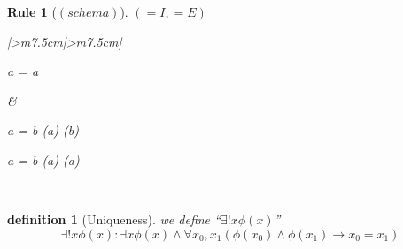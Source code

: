 \documentclass[10pt,a4paper]{book}
\newtheorem{definition}{definition}[section]
\newtheorem{Rule}{Rule}[section]
\begin{document}
\begin{Rule}
    [$(schema)$] $( = I , = E)$

    \begin{tabular}{|>{\centering\arraybackslash}m{7.5cm}|>{\centering\arraybackslash}m{7.5cm}|}
        \hline
        \begin{fitchproof}[arrayenv=tabular]
             {\therefore a = a } 
        \end{fitchproof}
        \rule[0pt]{0pt}{0pt} &
        \begin{minipage}[t]{\linewidth}
            \centering
            \begin{minipage}[t]{0.48\linewidth}
                \begin{fitchproof}[arrayenv=tabular]
                     {a = b }
                     {\phi(a) }
                     {\therefore  \phi(b) } 
                \end{fitchproof}
            \end{minipage}
            \begin{minipage}[t]{0.48\linewidth}
                \begin{fitchproof}[arrayenv=tabular]
                     {a = b }
                     { \phi(a)}
                     { \therefore  \phi(a)} 
                \end{fitchproof}
            \end{minipage}
        \end{minipage}
        \\
        \hline
    \end{tabular}

\end{Rule}

\begin{definition}
    [Uniqueness]
    we define ``$\exists ! x \phi(x)$''
    \\
    \[ \exists !  x \phi(x) : \exists   x \phi(x) \land \forall x_0 , x_1 ( \phi(x_0) \land \phi(x_1) \to x_0 = x_1) \]
\end{definition}
\end{document}
